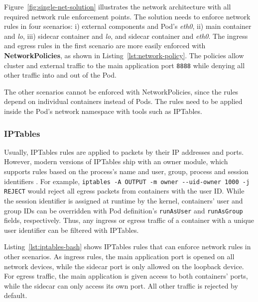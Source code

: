 \documentclass[english, 12pt, a4paper, sci, utf8, a-2b, online]{aaltothesis}
\begin{document}
Figure~\ref{fig:single-net-solution} illustrates the network architecture with all required network rule enforcement points.
The solution needs to enforce network rules in four scenarios: i) external components and Pod's \emph{eth0}, ii) main container and \emph{lo}, iii) sidecar container and \emph{lo}, and sidecar container and \emph{eth0}.
The ingress and egress rules in the first scenario are more easily enforced with \textbf{NetworkPolicies}, as shown in Listing~\ref{lst:network-policy}.
The policies allow cluster and external traffic to the main application port \lstinline{8888} while denying all other traffic into and out of the Pod.



The other scenarios cannot be enforced with NetworkPolicies, since the rules depend on individual containers instead of Pods.
The rules need to be applied inside the Pod's network namespace with tools such as IPTables.

\subsubsection{IPTables}

Usually, IPTables rules are applied to packets by their IP addresses and ports.
However, modern versions of IPTables ship with an owner module, which supports rules based on the process's name and user, group, process and session identifiers \cite{iptables-manpage}.
For example, \lstinline{iptables -A OUTPUT -m owner --uid-owner 1000 -j REJECT} would reject all egress packets from containers with the user ID.
While the session identifier is assigned at runtime by the kernel, containers' user and group IDs can be overridden with Pod definition's \lstinline{runAsUser} and \lstinline{runAsGroup} fields, respectively.
Thus, any ingress or egress traffic of a container with a unique user identifier can be filtered with IPTables.

Listing~\ref{lst:iptables-bash} shows IPTables rules that can enforce network rules in other scenarios.
As ingress rules, the main application port is opened on all network devices, while the sidecar port is only allowed on the loopback device.
For egress traffic, the main application is given access to both containers' ports, while the sidecar can only access its own port.
All other traffic is rejected by default.
\end{document}
